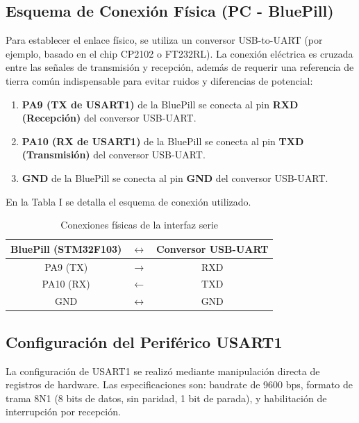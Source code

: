 \documentclass{plantilla}
\begin{document}
\subsection{Esquema de Conexión Física (PC - BluePill)}
Para establecer el enlace físico, se utiliza un conversor USB-to-UART (por ejemplo, basado en el chip CP2102 o FT232RL). La conexión eléctrica es cruzada entre las señales de transmisión y recepción, además de requerir una referencia de tierra común indispensable para evitar ruidos y diferencias de potencial:
\begin{enumerate}
    \item \textbf{PA9 (TX de USART1)} de la BluePill se conecta al pin \textbf{RXD (Recepción)} del conversor USB-UART.
    \item \textbf{PA10 (RX de USART1)} de la BluePill se conecta al pin \textbf{TXD (Transmisión)} del conversor USB-UART.
    \item \textbf{GND} de la BluePill se conecta al pin \textbf{GND} del conversor USB-UART.
\end{enumerate}

En la Tabla I se detalla el esquema de conexión utilizado.

\begin{table}[h]
\centering
\caption{Conexiones físicas de la interfaz serie}
\begin{tabular}{ccc}
\toprule
\textbf{BluePill (STM32F103)} & $\leftrightarrow$ & \textbf{Conversor USB-UART} \\
\midrule
PA9 (TX) & $\rightarrow$ & RXD \\
PA10 (RX) & $\leftarrow$ & TXD \\
GND & $\leftrightarrow$ & GND \\
\bottomrule
\end{tabular}
\end{table}

\subsection{Configuración del Periférico USART1}
La configuración de USART1 se realizó mediante manipulación directa de registros de hardware. Las especificaciones son: baudrate de 9600 bps, formato de trama 8N1 (8 bits de datos, sin paridad, 1 bit de parada), y habilitación de interrupción por recepción.
\end{document}
